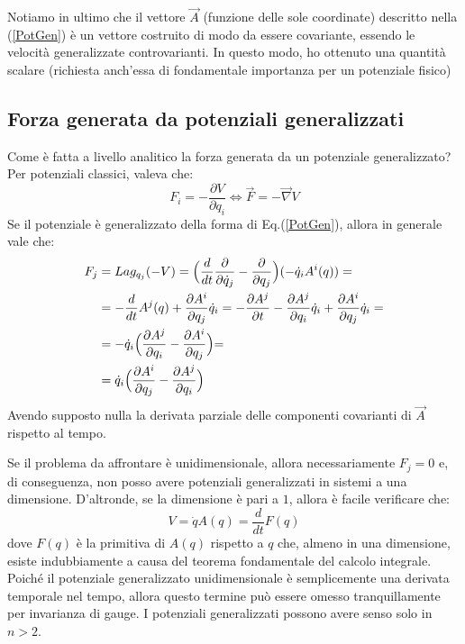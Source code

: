 \documentclass[a4paper,openany]{article}
\begin{document}
	Notiamo in ultimo che il vettore $\vec{A}$ (funzione delle sole coordinate) descritto nella (\ref{PotGen}) è un vettore costruito di modo da essere covariante, essendo le velocità generalizzate controvarianti. In questo modo, ho ottenuto una quantità scalare (richiesta anch'essa di fondamentale importanza per un potenziale fisico)
	\subsection{Forza generata da potenziali generalizzati}
	Come è fatta a livello analitico la forza generata da un potenziale generalizzato? Per potenziali classici, valeva che:
	$$
	F_i = - \dfrac{\partial V}{\partial q_i} \iff \vec{F} = -\vec{\nabla} V
	$$
	Se il potenziale è generalizzato della forma di Eq.(\ref{PotGen}), allora in generale vale che:
	\begin{equation}
		\begin{split}
			F_j &= Lag_{q_j}(-V) = \Bigl(\dfrac{d}{dt}\dfrac{\partial}{\partial \dot{q}_j}-\dfrac{\partial}{\partial q_j}\Bigl) (-\dot{q}_i A^{i}(q)) = \\
			&= -\dfrac{d}{dt}A^j (q) + \dfrac{\partial A^i}{\partial q_j}\dot{q}_i =- \dfrac{\partial A^j}{\partial t} - \dfrac{\partial A^j}{\partial q_i}\dot{q}_i + \dfrac{\partial A^i}{\partial q_j}\dot{q}_i = \\
			&= -\dot{q}_i \Bigl(\dfrac{\partial A^j}{\partial q_i} -\dfrac{\partial A^i}{\partial q_j}\Bigl) =\\
			&= \dot{q}_i \Bigl(\dfrac{\partial A^i}{\partial q_j} -\dfrac{\partial A^j}{\partial q_i}\Bigl)
		\end{split}
		\label{ForzaGen}
	\end{equation}
	Avendo supposto nulla la derivata parziale delle componenti covarianti di $\vec{A}$ rispetto al tempo. 
	
	Se il problema da affrontare è unidimensionale, allora necessariamente $F_j = 0$ e, di conseguenza, non posso avere potenziali generalizzati in sistemi a una dimensione. D'altronde, se la dimensione è pari a $1$, allora è facile verificare che:
	$$
	V = \dot{q}A(q) = \dfrac{d}{dt}F(q)
	$$
	dove $F(q)$ è la primitiva di $A(q)$ rispetto a $q$ che, almeno in una dimensione, esiste indubbiamente a causa del teorema fondamentale del calcolo integrale. Poiché il potenziale generalizzato unidimensionale è semplicemente una derivata temporale nel tempo, allora questo termine può essere omesso tranquillamente per invarianza di gauge. I potenziali generalizzati possono avere senso solo in $n>2$.
	
\end{document}
